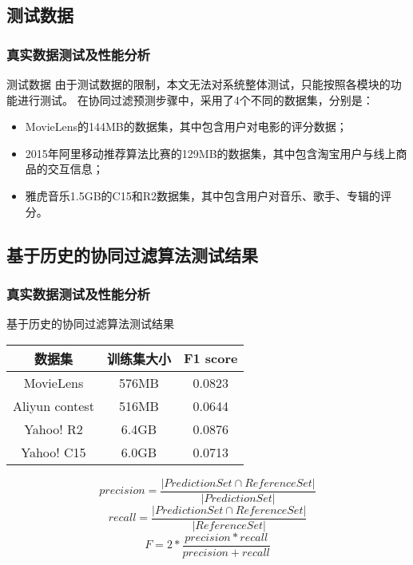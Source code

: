\documentclass{beamer}
\begin{document}
\subsection{测试数据}
\begin{frame}
	\frametitle{真实数据测试及性能分析}
		\begin{block}{测试数据}
		由于测试数据的限制，本文无法对系统整体测试，只能按照各模块的功能进行测试。
		在协同过滤预测步骤中，采用了4个不同的数据集，分别是：
		\begin{itemize}
		\item MovieLens的144MB的数据集，其中包含用户对电影的评分数据；
		\item 2015年阿里移动推荐算法比赛的129MB的数据集，其中包含淘宝用户与线上商品的交互信息；
		\item 雅虎音乐1.5GB的C15和R2数据集，其中包含用户对音乐、歌手、专辑的评分。
	\end{itemize}
	\end{block}
\end{frame}

\subsection{基于历史的协同过滤算法测试结果}
\begin{frame}[shrink]
	\frametitle{真实数据测试及性能分析}
		\begin{block}{基于历史的协同过滤算法测试结果}
		\begin{center}
\begin{tabular}{c|c|c}
 \hline
数据集 & 训练集大小 & F1 score \\ \hline
MovieLens & 576MB & 0.0823 \\ \hline
Aliyun contest & 516MB & 0.0644 \\ \hline
Yahoo! R2 & 6.4GB & 0.0876 \\ \hline
Yahoo! C15 & 6.0GB & 0.0713 \\ \hline
\end{tabular}
\end{center}
\begin{equation*}
precision= \frac{|PredictionSet\cap ReferenceSet|}{|PredictionSet|}
\end{equation*}
\begin{equation*}
recall= \frac{|PredictionSet\cap ReferenceSet|}{|ReferenceSet|}
\end{equation*}
\begin{equation*}
F= 2* \frac{precision*recall}{precision+recall}
\end{equation*}
	\end{block}
\end{frame}
\end{document}
